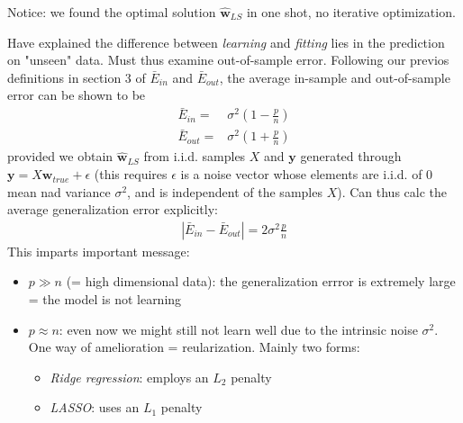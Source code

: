 \documentclass[norsk,a4paper,11pt]{article}
\begin{document}
Notice: we found the optimal solution $\hat{\mathbf{w}}_{LS}$ in one shot, no iterative optimization.

Have explained the difference between \textit{learning} and \textit{fitting} lies in the prediction on "unseen" data. Must thus examine out-of-sample error. Following our previos definitions in section 3 of $\bar{E}_{in}$ and $\bar{E}_{out}$, the average in-sample and out-of-sample error can be shown to be
\begin{align}
	\bar{E}_{in} =& \sigma^2 (1 - \frac{p}{n}) \\
	\bar{E}_{out} =& \sigma^2 (1 + \frac{p}{n})
\end{align}
provided we obtain $\hat{\mathbf{w}}_{LS}$ from i.i.d. samples $X$ and $\mathbf{y}$ generated through $\mathbf{y} = X \mathbf{w}_{true} + \epsilon$ (this requires $\epsilon$ is a noise vector whose elements are i.i.d. of 0 mean nad variance $\sigma^2$, and is independent of the samples $X$). Can thus calc the average generalization error explicitly:
\begin{align}
	|\bar{E}_{in} - \bar{E}_{out}| = 2\sigma^2 \frac{p}{n} 
\end{align} 
This imparts important message:
\begin{itemize}
	\item $p \gg n $ (= high dimensional data): the generalization errror is extremely large = the model is not learning
	\item $p \approx n$: even now we might still not learn well due to the intrinsic noise $\sigma^2$. One way of amelioration = reularization. Mainly two forms:
	\begin{itemize}
		\item \textit{Ridge regression}: employs an $L_2$ penalty
		\item \textit{LASSO}: uses an $L_1$ penalty
	\end{itemize} 
\end{itemize}
\end{document}
